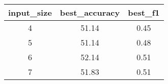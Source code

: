 \begin{tabular}{ccc}
	input\_size & best\_accuracy & best\_f1 \\\hline\hline
	4           & 51.14          & 0.45     \\
	5           & 51.14          & 0.48     \\
	6           & 52.14          & 0.51     \\
	7           & 51.83          & 0.51     \\
\end{tabular}